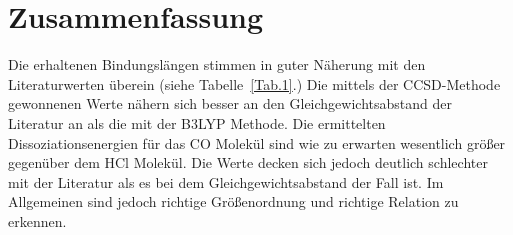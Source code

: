 \section{Zusammenfassung}

Die erhaltenen Bindungslängen stimmen in guter Näherung mit den Literaturwerten überein (siehe Tabelle~\ref{Tab.1}.) 
Die mittels der CCSD-Methode gewonnenen Werte nähern sich besser an den Gleichgewichtsabstand der Literatur an als die mit der B3LYP Methode. Die ermittelten Dissoziationsenergien für das CO Molekül sind wie zu erwarten wesentlich größer gegenüber dem HCl Molekül. Die Werte decken sich jedoch deutlich schlechter mit der Literatur als es bei dem Gleichgewichtsabstand der Fall ist. Im Allgemeinen sind jedoch richtige Größenordnung und richtige Relation zu erkennen.



 
 






%
